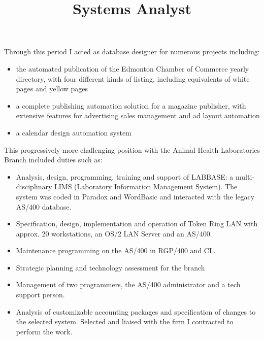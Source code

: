 \begin{resume}
\begin{position}
Through this period I acted as database designer for numerous projects including:
\begin{itemize}
\item the automated publication of the Edmonton Chamber of Commerce
  yearly directory, with four different kinds of listing, including equivalents of white pages and yellow pages
\item a complete publishing automation solution for a magazine publisher, with extensive features 
for advertising sales management and ad layout automation
\item a calendar design automation system


\end{itemize}

\end{position}



\title{Systems Analyst}
\begin{position}
This progressively more challenging position with the Animal Health
Laboratories Branch included duties such as:
\begin{itemize}
\item Analysis, design, programming, training and support of LABBASE: 
        a multi-disciplinary LIMS (Laboratory Information Management System).  
	The system was coded in Paradox and WordBasic and
	interacted with the legacy AS/400 database.
\item Specification, design, implementation and operation of Token Ring LAN 
	with approx. 20 workstations, an OS/2 LAN Server and an AS/400.  
\item Maintenance programming on the AS/400 in RGP/400 and CL.  
\item Strategic planning and technology assessment for the branch 
\item Management of two programmers, the AS/400 administrator and a
	 tech support person.
\item Analysis of customizable accounting packages and specification 
	of changes to the selected system. Selected and liaised with 
	the firm I contracted to perform the work.
\end{itemize}
\end{position}



\end{resume}
